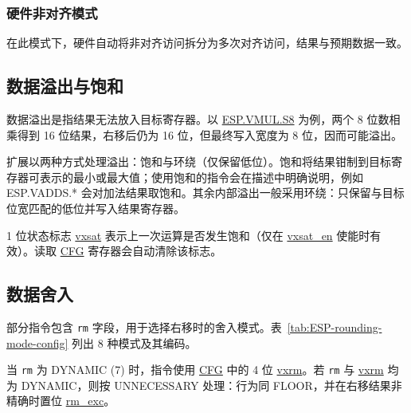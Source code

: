 \documentclass[main\_\_CN.tex]{subfiles}
\begin{document}
\subsubsection{硬件非对齐模式}

在此模式下，硬件自动将非对齐访问拆分为多次对齐访问，结果与预期数据一致。

\subsection{数据溢出与饱和}

数据溢出是指结果无法放入目标寄存器。以 \hyperref[instruction:ESPVMULS8]{ESP.VMUL.S8} 为例，两个 8 位数相乘得到 16 位结果，右移后仍为 16 位，但最终写入宽度为 8 位，因而可能溢出。

\chipname{} 扩展以两种方式处理溢出：饱和与环绕（仅保留低位）。饱和将结果钳制到目标寄存器可表示的最小或最大值；使用饱和的指令会在描述中明确说明，例如 ESP.VADDS.* 会对加法结果取饱和。其余内部溢出一般采用环绕：只保留与目标位宽匹配的低位并写入结果寄存器。

1 位状态标志 \hyperref[vxsat]{vxsat} 表示上一次运算是否发生饱和（仅在 \hyperref[vxsat_en]{vxsat\_en} 使能时有效）。读取 \hyperref[regdesc:ESPCFG]{CFG} 寄存器会自动清除该标志。

\subsection{数据舍入}

部分指令包含 \lstinline{rm} 字段，用于选择右移时的舍入模式。表~\ref{tab:ESP-rounding-mode-config} 列出 8 种模式及其编码。

当 \lstinline{rm} 为 DYNAMIC (7) 时，指令使用 \hyperref[regdesc:ESPCFG]{CFG} 中的 4 位 \hyperref[vxrm]{vxrm}。若 \lstinline{rm} 与 \hyperref[vxrm]{vxrm} 均为 DYNAMIC，则按 UNNECESSARY 处理：行为同 FLOOR，并在右移结果非精确时置位 \hyperref[rm_exc]{rm\_exc}。
\end{document}
